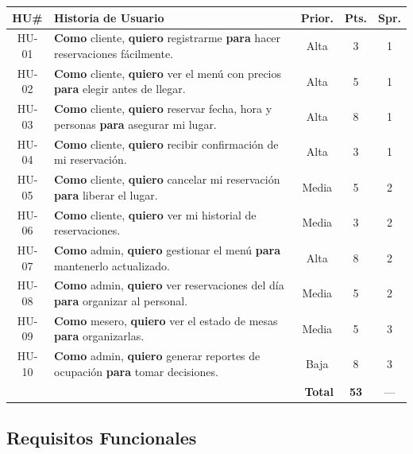 \documentclass[12pt,a4paper]{article}
\begin{document}
\begin{center}
{\small
\begin{tabular}{cp{7.5cm}ccc}
\toprule
\rowcolor{grisclaro}
\textbf{HU\#} & \textbf{Historia de Usuario} & \textbf{Prior.} & \textbf{Pts.} & \textbf{Spr.} \\
\midrule
HU-01 & \textbf{Como} cliente, \textbf{quiero} registrarme \textbf{para} hacer reservaciones fácilmente. & Alta & 3 & 1 \\
\rowcolor{grisclaro}
HU-02 & \textbf{Como} cliente, \textbf{quiero} ver el menú con precios \textbf{para} elegir antes de llegar. & Alta & 5 & 1 \\
HU-03 & \textbf{Como} cliente, \textbf{quiero} reservar fecha, hora y personas \textbf{para} asegurar mi lugar. & Alta & 8 & 1 \\
\rowcolor{grisclaro}
HU-04 & \textbf{Como} cliente, \textbf{quiero} recibir confirmación de mi reservación. & Alta & 3 & 1 \\
HU-05 & \textbf{Como} cliente, \textbf{quiero} cancelar mi reservación \textbf{para} liberar el lugar. & Media & 5 & 2 \\
\rowcolor{grisclaro}
HU-06 & \textbf{Como} cliente, \textbf{quiero} ver mi historial de reservaciones. & Media & 3 & 2 \\
HU-07 & \textbf{Como} admin, \textbf{quiero} gestionar el menú \textbf{para} mantenerlo actualizado. & Alta & 8 & 2 \\
\rowcolor{grisclaro}
HU-08 & \textbf{Como} admin, \textbf{quiero} ver reservaciones del día \textbf{para} organizar al personal. & Media & 5 & 2 \\
HU-09 & \textbf{Como} mesero, \textbf{quiero} ver el estado de mesas \textbf{para} organizarlas. & Media & 5 & 3 \\
\rowcolor{grisclaro}
HU-10 & \textbf{Como} admin, \textbf{quiero} generar reportes de ocupación \textbf{para} tomar decisiones. & Baja & 8 & 3 \\
\midrule
\multicolumn{3}{r}{\textbf{Total}} & \textbf{53} & --- \\
\bottomrule
\end{tabular}}
\end{center}

\subsection{Requisitos Funcionales}
\end{document}
